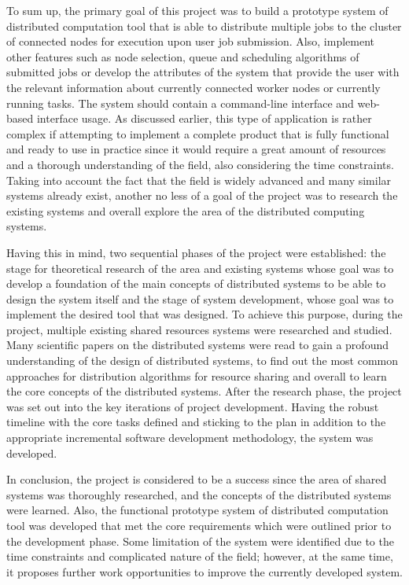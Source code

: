 \documentclass[10pt]{report}
\begin{document}
To sum up, the primary goal of this project was to build a prototype system of distributed computation tool that is able to distribute multiple jobs to the cluster of connected nodes for execution upon user job submission. Also, implement other features such as node selection, queue and scheduling algorithms of submitted jobs or develop the attributes of the system that provide the user with the relevant information about currently connected worker nodes or currently running tasks. The system should contain a command-line interface and web-based interface usage. As discussed earlier, this type of application is rather complex if attempting to implement a complete product that is fully functional and ready to use in practice since it would require a great amount of resources and a thorough understanding of the field, also considering the time constraints. Taking into account the fact that the field is widely advanced and many similar systems already exist, another no less of a goal of the project was to research the existing systems and overall explore the area of the distributed computing systems.
\newline

Having this in mind, two sequential phases of the project were established: the stage for theoretical research of the area and existing systems whose goal was to develop a foundation of the main concepts of distributed systems to be able to design the system itself and the stage of system development, whose goal was to implement the desired tool that was designed. To achieve this purpose, during the project, multiple existing shared resources systems were researched and studied. Many scientific papers on the distributed systems were read to gain a profound understanding of the design of distributed systems, to find out the most common approaches for distribution algorithms for resource sharing and overall to learn the core concepts of the distributed systems. After the research phase, the project was set out into the key iterations of project development. Having the robust timeline with the core tasks defined and sticking to the plan in addition to the appropriate incremental software development methodology, the system was developed.
\newline

In conclusion, the project is considered to be a success since the area of shared systems was thoroughly researched, and the concepts of the distributed systems were learned. Also, the functional prototype system of distributed computation tool was developed that met the core requirements which were outlined prior to the development phase. Some limitation of the system were identified due to the time constraints and complicated nature of the field; however, at the same time, it proposes further work opportunities to improve the currently developed system.
\end{document}
